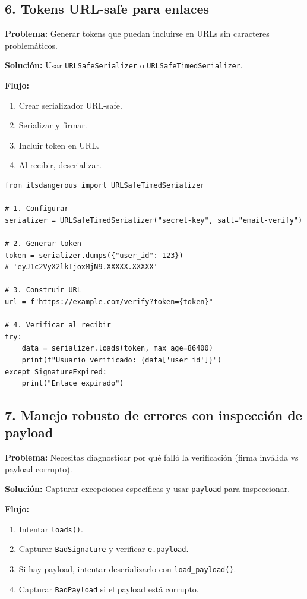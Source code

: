 \documentclass[11pt,a4paper]{article}
\begin{document}
\subsection*{6. Tokens URL-safe para enlaces}


\textbf{Problema:} Generar tokens que puedan incluirse en URLs sin caracteres problemáticos.


\textbf{Solución:} Usar \texttt{URLSafeSerializer} o \texttt{URLSafeTimedSerializer}.


\textbf{Flujo:}


\begin{enumerate}[leftmargin=*,topsep=2pt,itemsep=1pt]
  \item Crear serializador URL-safe.
  \item Serializar y firmar.
  \item Incluir token en URL.
  \item Al recibir, deserializar.
\end{enumerate}


\begin{lstlisting}
from itsdangerous import URLSafeTimedSerializer

# 1. Configurar
serializer = URLSafeTimedSerializer("secret-key", salt="email-verify")

# 2. Generar token
token = serializer.dumps({"user_id": 123})
# 'eyJ1c2VyX2lkIjoxMjN9.XXXXX.XXXXX'

# 3. Construir URL
url = f"https://example.com/verify?token={token}"

# 4. Verificar al recibir
try:
    data = serializer.loads(token, max_age=86400)
    print(f"Usuario verificado: {data['user_id']}")
except SignatureExpired:
    print("Enlace expirado")
\end{lstlisting}


\subsection*{7. Manejo robusto de errores con inspección de payload}


\textbf{Problema:} Necesitas diagnosticar por qué falló la verificación (firma inválida vs payload corrupto).


\textbf{Solución:} Capturar excepciones específicas y usar \texttt{payload} para inspeccionar.


\textbf{Flujo:}


\begin{enumerate}[leftmargin=*,topsep=2pt,itemsep=1pt]
  \item Intentar \texttt{loads()}.
  \item Capturar \texttt{BadSignature} y verificar \texttt{e.payload}.
  \item Si hay payload, intentar deserializarlo con \texttt{load\_payload()}.
  \item Capturar \texttt{BadPayload} si el payload está corrupto.
\end{enumerate}
\end{document}
